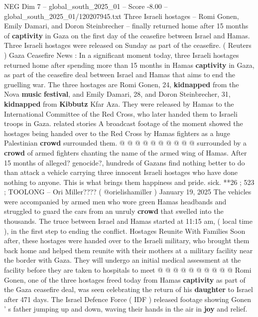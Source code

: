 \begin{textsample}{NEG Dim 7 – global\_south\_2025\_01 – Score -8.00 – global\_south\_2025\_01/120207945.txt}  \label{ex:f7_neg_193}
Three Israeli hostages -- Romi Gonen, Emily Damari, and Doron Steinbrecher -- finally returned home after 15 months of \textbf{captivity} in Gaza on the first day of the ceasefire between Israel and Hamas.
Three Israeli hostages were released on Sunday as part of the ceasefire. ( Reuters ) Gaza Ceasefire News : In a significant moment today, three Israeli hostages returned home after spending more than 15 months in Hamas \textbf{captivity} in Gaza, as part of the ceasefire deal between Israel and Hamas that aims to end the gruelling war.
The three hostages are Romi Gonen, 24, \textbf{kidnapped} from the Nova \textbf{music} \textbf{festival}, and Emily Damari, 28, and Doron Steinbrecher, 31, \textbf{kidnapped} from \textbf{Kibbutz} Kfar Aza.
They were released by Hamas to the International Committee of the Red Cross, who later handed them to Israeli troops in Gaza. related stories A broadcast footage of the moment showed the hostages being handed over to the Red Cross by Hamas fighters as a huge Palestinian \textbf{crowd} surrounded them. @ @ @ @ @ @ @ @ @ @ surrounded by a \textbf{crowd} of armed fighters chanting the name of the armed wing of Hamas.
After 15 months of alleged? genocide?, hundreds of Gazans find nothing better to do than attack a vehicle carrying three innocent Israeli hostages who have done nothing to anyone.
This is what brings them happiness and pride. sick. **26 ; 523 ; TOOLONG -- Ori Miller???? ( @orielishamiller ) January 19, 2025 The vehicles were accompanied by armed men who wore green Hamas headbands and struggled to guard the cars from an unruly \textbf{crowd} that swelled into the thousands.
The truce between Israel and Hamas started at 11:15 am, ( local time ), in the first step to ending the conflict.
Hostages Reunite With Families Soon after, these hostages were handed over to the Israeli military, who brought them back home and helped them reunite with their mothers at a military facility near the border with Gaza.
They will undergo an initial medical assessment at the facility before they are taken to hospitals to meet @ @ @ @ @ @ @ @ @ @ Romi Gonen, one of the three hostages freed today from Hamas \textbf{captivity} as part of the Gaza ceasefire deal, was seen celebrating the return of his \textbf{daughter} to Israel after 471 days.
The Israel Defence Force ( IDF ) released footage showing Gonen ' s father jumping up and down, waving their hands in the air in \textbf{joy} and relief.

\end{textsample}
